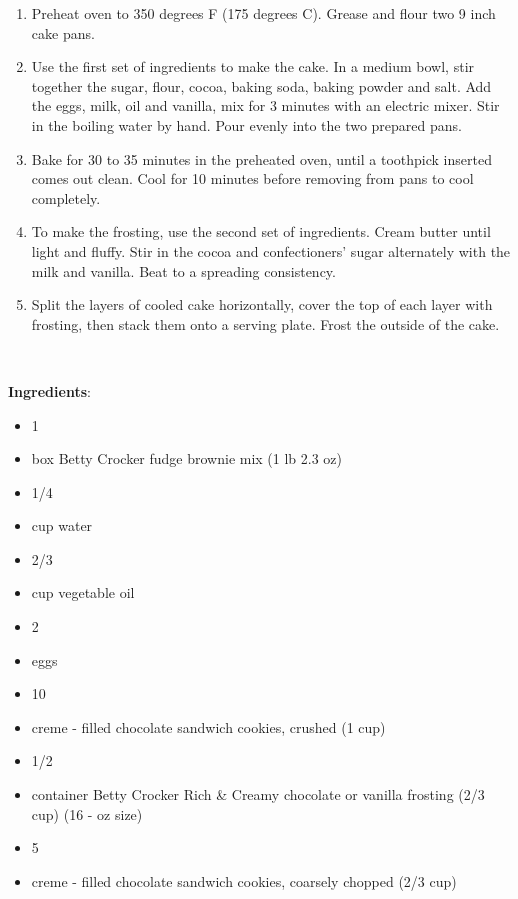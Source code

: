 \documentclass[11pt, twoside, openany]{book}
\begin{document}
\vspace{-3mm}\begin{enumerate}\setlength\itemsep{-1mm}
\item Preheat oven to 350 degrees F (175 degrees C). Grease and flour two 9 inch cake pans.
\item Use the first set of ingredients to make the cake. In a medium bowl, stir together the sugar, flour, cocoa, baking soda, baking powder and salt. Add the eggs, milk, oil and vanilla, mix for 3 minutes with an electric mixer. Stir in the boiling water by hand. Pour evenly into the two prepared pans.
\item Bake for 30 to 35 minutes in the preheated oven, until a toothpick inserted comes out clean. Cool for 10 minutes before removing from pans to cool completely.
\item To make the frosting, use the second set of ingredients. Cream butter until light and fluffy. Stir in the cocoa and confectioners' sugar alternately with the milk and vanilla. Beat to a spreading consistency.
\item Split the layers of cooled cake horizontally, cover the top of each layer with frosting, then stack them onto a serving plate. Frost the outside of the cake.
\end{enumerate}
 \label{cookies-'n-creme-brownies}\hfill\textit{}\\
\begin{minipage}[t]{0.8\linewidth}
\textbf{Ingredients}:\vspace{-3mm}
\begin{multicols}{2}
\begin{itemize}\setlength\itemsep{-1mm}
\item 1 
\item box Betty Crocker fudge brownie mix (1 lb 2.3 oz)
\item 1/4 
\item cup water
\item 2/3 
\item cup vegetable oil
\item 2 
\item eggs
\item 10 
\item creme - filled chocolate sandwich cookies, crushed (1 cup)
\item 1/2 
\item container Betty Crocker Rich & Creamy chocolate or vanilla frosting (2/3 cup) (16 - oz size)
\item 5 
\item creme - filled chocolate sandwich cookies, coarsely chopped (2/3 cup)
\end{itemize}
\end{multicols}
\end{minipage}
\end{document}
